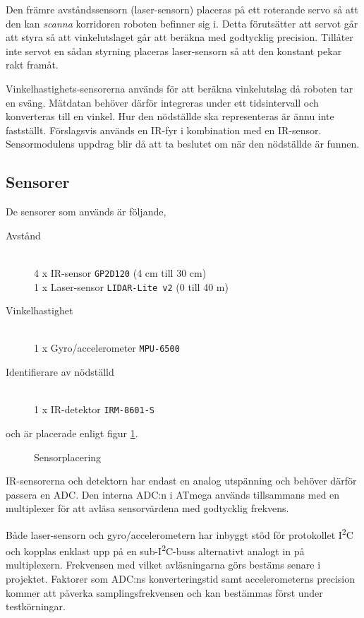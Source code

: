 \documentclass[11pt]{article}
\begin{document}
\begin{flushleft}
Den främre avståndssensorn (laser-sensorn) placeras på ett roterande servo så att den kan \emph{scanna} korridoren roboten befinner sig i. Detta förutsätter att servot går att styra så att vinkelutslaget går att beräkna med godtycklig precision. Tillåter inte servot en sådan styrning placeras laser-sensorn så att den konstant pekar rakt framåt.

Vinkelhastighets-sensorerna används för att beräkna vinkelutslag då roboten tar en sväng. Mätdatan behöver därför integreras under ett tidsintervall och konverteras till en vinkel. Hur den nödställde ska representeras är ännu inte fastställt. Förslagsvis används en IR-fyr i kombination med en IR-sensor. Sensormodulens uppdrag blir då att ta beslutet om när den nödställde är funnen.


\subsection{Sensorer}
De sensorer som används är följande,
\begin{description}
	\item[Avstånd] \hfill \\
	4 x IR-sensor \verb+GP2D120+ (4 cm till 30 cm) \\
	1 x Laser-sensor \verb+LIDAR-Lite v2+ (0 till 40 m) \\
	\item[Vinkelhastighet] \hfill \\
	1 x Gyro/accelerometer \verb+MPU-6500+ 
	\item[Identifierare av nödställd] \hfill \\
	1 x IR-detektor \verb+IRM-8601-S+
\end{description}
och är placerade enligt figur \ref{sensors}. 

\begin{figure}[htbp]
\centering
\noindent\resizebox{.8\textwidth}{!}{
		}
	\caption{Sensorplacering \label{sensors}}
\end{figure}

IR-sensorerna och detektorn har endast en analog utspänning och behöver därför passera en ADC. Den interna ADC:n i ATmega används tillsammans med en multiplexer för att avläsa sensorvärdena med godtycklig frekvens. 

Både laser-sensorn och gyro/accelerometern har inbyggt stöd för protokollet I\textsuperscript{2}C och kopplas enklast upp på en sub-I\textsuperscript{2}C-buss alternativt analogt in på multiplexern. Frekvensen med vilket avläsningarna görs bestäms senare i projektet. Faktorer som ADC:ns konverteringstid samt accelerometerns precision kommer att påverka samplingsfrekvensen och kan bestämmas först under testkörningar. 


\end{flushleft}
\end{document}
